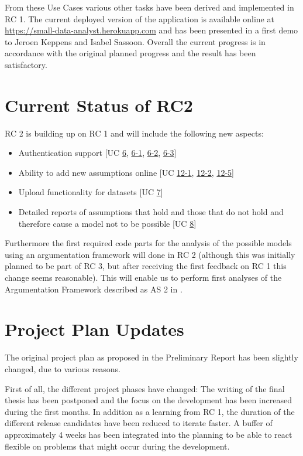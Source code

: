 \documentclass[11pt,twocolumn]{article}
\begin{document}
From these Use Cases various other tasks have been derived and implemented in RC 1. The current deployed version of the application is available online at \href{https://small-data-analyst.herokuapp.com}{https://small-data-analyst.herokuapp.com} and has been presented in a first demo to Jeroen Keppens and Isabel Sassoon. Overall the current progress is in accordance with the original planned progress and the result has been satisfactory.

\section{ Current Status of RC2}
RC 2 is building up on RC 1 and will include the following new aspects:
\begin{itemize}
	\item Authentication support [UC \href{https://trello.com/c/CVGBVWID}{6}, \href{https://trello.com/c/pId27kJM}{6-1}, \href{https://trello.com/c/pQ98qgSL}{6-2}, \href{https://trello.com/c/mvxBeNSR}{6-3}]
	\item Ability to add new assumptions online [UC \href{https://trello.com/c/2V6Cl65u}{12-1}, \href{https://trello.com/c/OwM2Z7wt}{12-2}, \href{https://trello.com/c/Rg6GPnNE}{12-5}]
	\item Upload functionality for datasets [UC \href{https://trello.com/c/DidVQKAS}{7}]
	\item Detailed reports of assumptions that hold and those that do not hold and therefore cause a model not to be possible [UC \href{https://trello.com/c/be2088JH}{8}]
\end{itemize}

Furthermore the first required code parts for the analysis of the possible models using an argumentation framework will done in RC 2 (although this was initially planned to be part of RC 3, but after receiving the first feedback on RC 1 this change seems reasonable). This will enable us to perform first analyses of the Argumentation Framework described as AS 2 in \cite{sassoon2014}. 

\section{ Project Plan Updates}

The original project plan as proposed in the Preliminary Report has been slightly changed, due to various reasons. 

First of all, the different project phases have changed: The writing of the final thesis has been postponed and the focus on the development has been increased during the first months. 
In addition as a learning from RC 1, the duration of the different release candidates have been reduced to iterate faster. A buffer of approximately 4 weeks has been integrated into the planning to be able to react flexible on problems that might occur during the development. 
\end{document}

